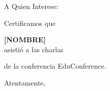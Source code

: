 \documentclass{letter}[14pt]
\date{Quito, 30 de marzo 2019}
\begin{document}

\begin{letter}{A Quien Interese:}

\opening{\vspace{0.5cm}Certificamos que\\}

{\centering \Large \bf [NOMBRE]\\}
\vspace{0.5cm}
asistió a las charlas\\
\vspace{0.5cm}


de la conferencia EduConference.

\lipsum[66]


\closing{Atentamente,}
\end{letter}
\end{document}
